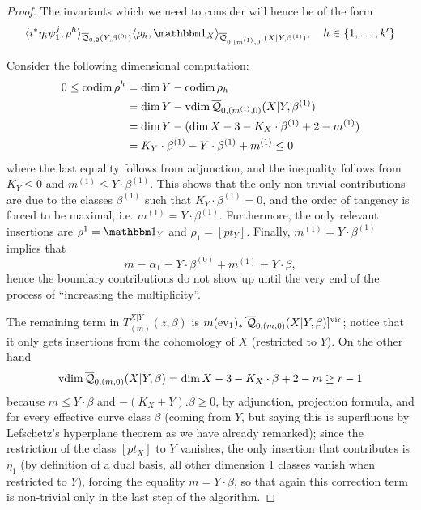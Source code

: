 \begin{proof}
 The invariants which we need to consider will hence be of the form
 \[
  \langle i^*\eta_i\psi_1^j,\rho^h\rangle_{\Q{0}{2}{Y}{\beta^{(0)}}}\langle \rho_h,\mathbbm 1_{X}\rangle_{\Q{0}{(m^{(1)},0)}{X|Y}{\beta^{(1)}}}, \quad h\in\{1,\ldots,k'\}
 \]
 
 Consider the following dimensional computation:
\begin{align*}
 0\leq \operatorname{codim} \rho^h &= \dim Y-\operatorname{codim} \rho_h \\
 &= \dim Y-\operatorname{vdim} \overline{\mathcal Q}_{0,(m^{(1)},0)}(X|Y,\beta^{(1)}) \\
 &= \dim Y-(\dim X-3-K_{X}\cdot \beta^{(1)}+2-m^{(1)})\\
 &= K_Y \cdot \beta^{(1)}-Y \cdot \beta^{(1)}+m^{(1)}\leq 0
\end{align*}
 where the last equality follows from adjunction, and the inequality follows from $K_Y\leq 0$ and $m^{(1)}\leq Y \cdot \beta^{(1)}$.
This shows that the only non-trivial contributions are due to the classes $\beta^{(1)}$ such that $K_Y \cdot \beta^{(1)}=0$, and the order of tangency is forced to be maximal, i.e. $m^{(1)}=Y \cdot \beta^{(1)}$. Furthermore, the only relevant insertions are $\rho^1=\mathbbm 1_Y$ and $\rho_1=[pt_Y]$. Finally, $m^{(1)}=Y \cdot \beta^{(1)}$ implies that
\[
 m=\alpha_1=Y \cdot \beta^{(0)}+m^{(1)}=Y \cdot \beta,
\]
hence the boundary contributions do not show up until the very end of the process of ``increasing the multiplicity''.

The remaining term in $T_{(m)}^{X|Y}(z,\beta)$ is $m(\operatorname{ev}_1)_*[\overline{\mathcal Q}_{0,(m,0)}(X|Y,\beta)]^\text{vir}$; notice that it only gets insertions from the cohomology of $X$ (restricted to $Y$). On the other hand
\[
 \operatorname{vdim} \overline{\mathcal Q}_{0,(m,0)}(X|Y,\beta)=\dim X-3 -K_X \cdot \beta +2-m \geq r-1
\]
because $m\leq Y\cdot\beta$ and $-(K_X+Y).\beta\geq 0$, by adjunction, projection formula, and for every effective curve class $\beta$ (coming from $Y$, but saying this is superfluous by Lefschetz's hyperplane theorem as we have already remarked); since the restriction of the class $[pt_X]$ to $Y$ vanishes, the only insertion that contributes is $\eta_1$ (by definition of a dual basis, all other dimension 1 classes vanish when restricted to $Y$), forcing the equality $m=Y\cdot\beta$, so that again this correction term is non-trivial only in the last step of the algorithm.


\end{proof}
